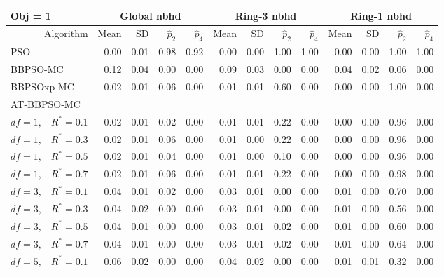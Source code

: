 \documentclass[12pt]{article}
\begin{document}
\begin{table}[ht]
\centering
\footnotesize{
\begin{tabular}{r|rrrr|rrrr|rrrr}
\multicolumn{1}{l}{Obj = 1} & \multicolumn{4}{c}{Global nbhd} & \multicolumn{4}{c}{Ring-3 nbhd} & \multicolumn{4}{c}{Ring-1 nbhd}\\
  \hline
Algorithm & Mean & SD & $\widehat{p}_2$ & $\widehat{p}_4$ & Mean & SD & $\widehat{p}_2$ & $\widehat{p}_4$ & Mean & SD & $\widehat{p}_2$ & $\widehat{p}_4$ \\ 
  \hline
\multicolumn{1}{l|}{PSO} & 0.00 & 0.01 & 0.98 & 0.92 & 0.00 & 0.00 & 1.00 & 1.00 & 0.00 & 0.00 & 1.00 & 1.00 \\ 
  \multicolumn{1}{l|}{BBPSO-MC} & 0.12 & 0.04 & 0.00 & 0.00 & 0.09 & 0.03 & 0.00 & 0.00 & 0.04 & 0.02 & 0.06 & 0.00 \\ 
  \multicolumn{1}{l|}{BBPSOxp-MC} & 0.02 & 0.01 & 0.06 & 0.00 & 0.01 & 0.01 & 0.60 & 0.00 & 0.00 & 0.00 & 1.00 & 0.00 \\ 
\hline
\multicolumn{1}{l|}{AT-BBPSO-MC} &&&&&&&&&&&&\\
  $df = 1,\enspace$ $R^* =0.1$ & 0.02 & 0.01 & 0.02 & 0.00 & 0.01 & 0.01 & 0.22 & 0.00 & 0.00 & 0.00 & 0.96 & 0.00 \\ 
  $df = 1,\enspace$ $R^* =0.3$ & 0.02 & 0.01 & 0.06 & 0.00 & 0.01 & 0.00 & 0.22 & 0.00 & 0.00 & 0.00 & 0.96 & 0.00 \\ 
  $df = 1,\enspace$ $R^* =0.5$ & 0.02 & 0.01 & 0.04 & 0.00 & 0.01 & 0.00 & 0.10 & 0.00 & 0.00 & 0.00 & 0.96 & 0.00 \\ 
  $df = 1,\enspace$ $R^* =0.7$ & 0.02 & 0.01 & 0.06 & 0.00 & 0.01 & 0.01 & 0.22 & 0.00 & 0.00 & 0.00 & 0.98 & 0.00 \\ 
  $df = 3,\enspace$ $R^* =0.1$ & 0.04 & 0.01 & 0.02 & 0.00 & 0.03 & 0.01 & 0.00 & 0.00 & 0.01 & 0.00 & 0.70 & 0.00 \\ 
  $df = 3,\enspace$ $R^* =0.3$ & 0.04 & 0.02 & 0.00 & 0.00 & 0.03 & 0.01 & 0.00 & 0.00 & 0.01 & 0.00 & 0.56 & 0.00 \\ 
  $df = 3,\enspace$ $R^* =0.5$ & 0.04 & 0.01 & 0.00 & 0.00 & 0.03 & 0.01 & 0.02 & 0.00 & 0.01 & 0.00 & 0.60 & 0.00 \\ 
  $df = 3,\enspace$ $R^* =0.7$ & 0.04 & 0.01 & 0.00 & 0.00 & 0.03 & 0.01 & 0.02 & 0.00 & 0.01 & 0.00 & 0.64 & 0.00 \\ 
  $df = 5,\enspace$ $R^* =0.1$ & 0.06 & 0.02 & 0.00 & 0.00 & 0.04 & 0.02 & 0.00 & 0.00 & 0.01 & 0.01 & 0.32 & 0.00 \\ 

\end{tabular}}
\end{table}
\end{document}
